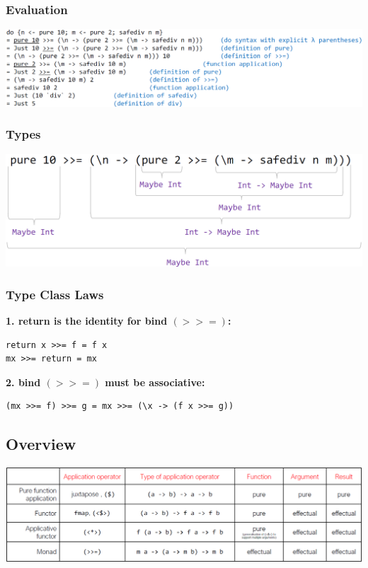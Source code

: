 \subsubsection{Evaluation}
\includegraphics[width=\linewidth]{img/monads_eval.png}

\subsubsection{Types}
\includegraphics[width=\linewidth]{img/monads_types.png}

\subsubsection{Type Class Laws}
\textbf{1. return is the identity for bind $(>>=)$:}
\begin{lstlisting}
return x >>= f = f x
mx >>= return = mx
\end{lstlisting}
\textbf{2. bind $(>>=)$ must be associative:}
\begin{lstlisting}
(mx >>= f) >>= g = mx >>= (\x -> (f x >>= g))
\end{lstlisting}

\subsection{Overview}
\includegraphics[width=\linewidth]{img/overview.png}